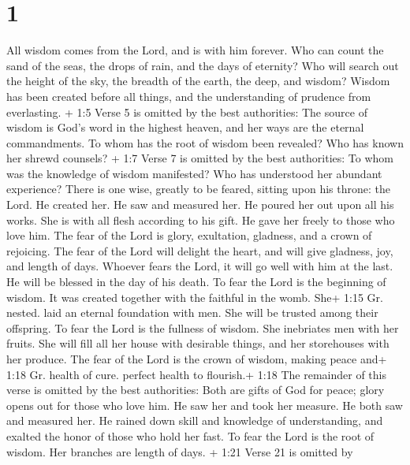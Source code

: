 \hypertarget{section}{%
\section{1}\label{section}}

 All wisdom comes from the Lord, and is with him forever.
 Who can count the sand of the seas, the drops of rain, and
the days of eternity?  Who will search out the height of the
sky, the breadth of the earth, the deep, and wisdom?  Wisdom
has been created before all things, and the understanding of prudence
from everlasting.  + 1:5 Verse 5 is omitted by the best
authorities: The source of wisdom is God's word in the highest heaven,
and her ways are the eternal commandments.  To whom has the
root of wisdom been revealed? Who has known her shrewd counsels?
 + 1:7 Verse 7 is omitted by the best authorities: To whom
was the knowledge of wisdom manifested? Who has understood her abundant
experience?  There is one wise, greatly to be feared,
sitting upon his throne: the Lord.  He created her. He saw
and measured her. He poured her out upon all his works. 
She is with all flesh according to his gift. He gave her freely to those
who love him.  The fear of the Lord is glory, exultation,
gladness, and a crown of rejoicing.  The fear of the Lord
will delight the heart, and will give gladness, joy, and length of days.
 Whoever fears the Lord, it will go well with him at the
last. He will be blessed in the day of his death.  To fear
the Lord is the beginning of wisdom. It was created together with the
faithful in the womb.  She+ 1:15 Gr. nested. laid an
eternal foundation with men. She will be trusted among their offspring.
 To fear the Lord is the fullness of wisdom. She inebriates
men with her fruits.  She will fill all her house with
desirable things, and her storehouses with her produce. 
The fear of the Lord is the crown of wisdom, making peace and+ 1:18 Gr.
health of cure. perfect health to flourish.+ 1:18 The remainder of this
verse is omitted by the best authorities: Both are gifts of God for
peace; glory opens out for those who love him. He saw her and took her
measure.  He both saw and measured her. He rained down
skill and knowledge of understanding, and exalted the honor of those who
hold her fast.  To fear the Lord is the root of wisdom. Her
branches are length of days.  + 1:21 Verse 21 is omitted by

